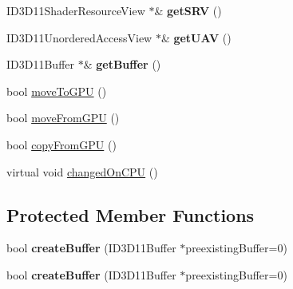 \begin{DoxyCompactItemize}
I\+D3\+D11\+Shader\+Resource\+View $\ast$\& {\bfseries get\+S\+RV} ()
\item 
\mbox{\label{classbtDX11Buffer_a9ffb747f0b720537b57e041f3624fad9}} 
I\+D3\+D11\+Unordered\+Access\+View $\ast$\& {\bfseries get\+U\+AV} ()
\item 
\mbox{\label{classbtDX11Buffer_a73096596706e2a9c91744c7f6ff44265}} 
I\+D3\+D11\+Buffer $\ast$\& {\bfseries get\+Buffer} ()
\item 
bool \hyperlink{classbtDX11Buffer_a6d374469254cb3c03d6e18d03ca8a23c}{move\+To\+G\+PU} ()
\item 
bool \hyperlink{classbtDX11Buffer_aacac21503809131b8991c0cee42e0b1b}{move\+From\+G\+PU} ()
\item 
bool \hyperlink{classbtDX11Buffer_a116aed0cd9715e4776e08ecccc68d01b}{copy\+From\+G\+PU} ()
\item 
virtual void \hyperlink{classbtDX11Buffer_a8018a897370ed73bcca0b4907b9479b1}{changed\+On\+C\+PU} ()
\end{DoxyCompactItemize}
\subsection*{Protected Member Functions}
\begin{DoxyCompactItemize}
\item 
\mbox{\label{classbtDX11Buffer_aa1707814ad282663e3e8484fd87811f1}} 
bool {\bfseries create\+Buffer} (I\+D3\+D11\+Buffer $\ast$preexisting\+Buffer=0)
\item 
\mbox{\label{classbtDX11Buffer_aa1707814ad282663e3e8484fd87811f1}} 
bool {\bfseries create\+Buffer} (I\+D3\+D11\+Buffer $\ast$preexisting\+Buffer=0)
\end{DoxyCompactItemize}
